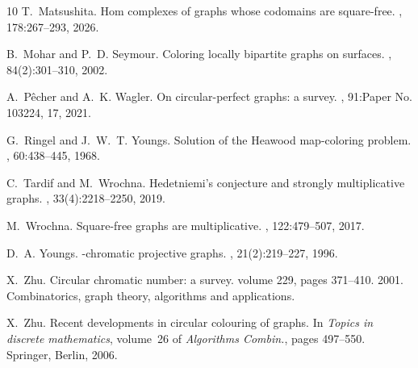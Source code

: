 \documentclass[11pt, amsfonts]{amsart}
\numberwithin{equation}{section}
\theoremstyle{definition}
\theoremstyle{remark}
\begin{document}
\begin{thebibliography}{10}
T.~Matsushita.
\newblock Hom complexes of graphs whose codomains are square-free.
, 178:267--293, 2026.

B.~Mohar and P.~D. Seymour.
\newblock Coloring locally bipartite graphs on surfaces.
, 84(2):301--310, 2002.

A.~P\^echer and A.~K. Wagler.
\newblock On circular-perfect graphs: a survey.
, 91:Paper No. 103224, 17, 2021.

G.~Ringel and J.~W.~T. Youngs.
\newblock Solution of the {H}eawood map-coloring problem.
, 60:438--445, 1968.

C.~Tardif and M.~Wrochna.
\newblock Hedetniemi's conjecture and strongly multiplicative graphs.
, 33(4):2218--2250, 2019.

M.~Wrochna.
\newblock Square-free graphs are multiplicative.
, 122:479--507, 2017.

D.~A. Youngs.
-chromatic projective graphs.
, 21(2):219--227, 1996.

X.~Zhu.
\newblock Circular chromatic number: a survey.
\newblock volume 229, pages 371--410. 2001.
\newblock Combinatorics, graph theory, algorithms and applications.

X.~Zhu.
\newblock Recent developments in circular colouring of graphs.
\newblock In {\em Topics in discrete mathematics}, volume~26 of {\em Algorithms
  Combin.}, pages 497--550. Springer, Berlin, 2006.

\end{thebibliography}
\end{document}
